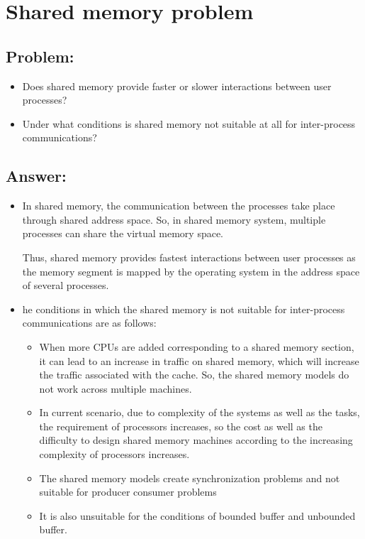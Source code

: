 \newpage
\section{Shared memory problem}
\subsection{Problem:}
\begin{itemize}
    \item Does shared memory provide faster or slower interactions between user processes?
    \item Under what conditions is shared memory not suitable at all for inter-process communications? 
\end{itemize}

\subsection{Answer:}
\begin{itemize}
    \item In shared memory, the communication between the processes take place through shared address space. So, in shared memory system, multiple processes can share the virtual memory space.

Thus, shared memory provides fastest interactions between user processes as the memory segment is mapped by the operating system in the address space of several processes.

    \item he conditions in which the shared memory is not suitable for inter-process communications are as follows:
        \begin{itemize}
            \item When more CPUs are added corresponding to a shared memory section, it can lead to an increase in traffic on shared memory, which will increase the traffic associated with the cache. So, the shared memory models do not work across multiple machines.
            \item In current scenario, due to complexity of the systems as well as the tasks, the requirement of processors increases, so the cost as well as the difficulty to design shared memory machines according to the increasing complexity of processors increases.
            \item The shared memory models create synchronization problems and not suitable for producer consumer problems
            \item It is also unsuitable for the conditions of bounded buffer and unbounded buffer.
        \end{itemize}
\end{itemize}
